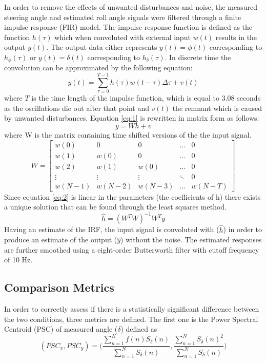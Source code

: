 In order to remove the effects of unwanted disturbances and noise, the  measured steering angle and estimated  roll angle signals were filtered through a finite impulse response (FIR) model. The impulse response function is defined as the function \(h(\tau)\) which when convoluted with external input \(w(t)\) results in the output \(y(t)\). The output data either represents \(y(t)=\phi(t)\) corresponding to \(h_\phi(\tau)\) or \(y(t)=\delta(t)\) corresponding to \(h_\delta(\tau)\). In discrete time the convolution can be approximated by the following equation:
\begin{equation}
\label{eq:1}
y(t)=\sum_{\tau=0}^{T-1} h(\tau) w(t-\tau)\Delta \tau + v(t)
\end{equation}
where \(T\) is the time length of the impulse function, which  is equal to 3.08 seconds as the oscillations die out after that point and \(v(t)\) the remnant which is caused by unwanted disturbances.
Equation \ref{eq:1} is rewritten in matrix form as follows:
\begin{equation}
\label{eq:2}
y=Wh+v
\end{equation}
where W is the matrix containing time shifted versions of the the input signal.
\begin{equation}
W=\begin{bmatrix} {w(0)} & {0} & {0} & {\dots} & {0} \\ {w(1)} & {w(0)} & {0} & {\dots} & {0} \\ {w(2)} & {w(1)} & {w(0)} & {\dots} & {0} \\ {\vdots} & {\vdots} & {\vdots} & {\ddots} & {0} \\ {w(N-1)} & {w(N-2)} & {w(N-3)} & {\dots} & {w(N-T)}\end{bmatrix}
\end{equation}
Since equation \ref{eq:2} is linear in the parameters (the coefficients of h) there exists a unique solution that can be found through the least squares method.
\begin{equation}
\hat{h}=\left(W^{T} W\right)^{-1} W^{T} y
\end{equation}
Having an estimate of the IRF, the input signal is convoluted with (\(\hat{h}\)) in order to produce  an estimate of the output (\(\hat{y}\))  without the noise. The estimated responses are further smoothed using a eight-order Butterworth filter with cutoff frequency of 10 Hz.


\subsection{Comparison Metrics}
In order to correctly assess if there is a statistically significant difference between the two conditions, three metrics are defined. The first one is the  Power Spectral Centroid (PSC) of measured angle (\(\delta\)) defined as 
\begin{equation}
(PSC_x , PSC_y) =\Bigg( \frac{\sum_{n=1}^{N} f(n) S_\delta(n)}{\sum_{n=1}^{N} S_\delta(n)},\frac{\sum_{n=1}^{N}  S_
\delta(n)^2}{\sum_{n=1}^{N} S_\delta(n)}\Bigg)
\end{equation}

